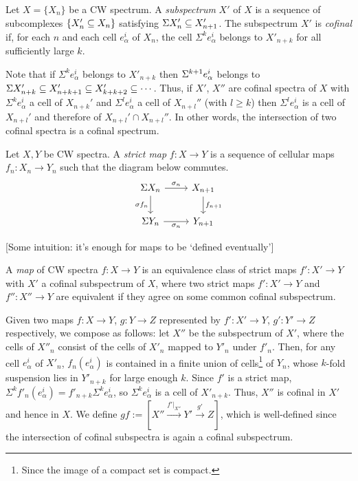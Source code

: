 \documentclass{MetricNotes2023}
\def\subq{\ensuremath\subseteq}
\def\SIgma{\ensuremath\Sigma}
\begin{document}
\begin{definition}
Let \(X=\{X_n\}\) be a CW spectrum. A \textit{subspectrum} \(X'\) of \(X\) is a sequence of subcomplexes \(\{X_n'\subq X_n\}\) satisfying \(\Sigma X_n'\subq X_{n+1}'\). The subspectrum \(X'\) is \textit{cofinal} if, for each \(n\) and each cell \(e^i_\alpha\) of \(X_n\), the cell \(\Sigma^k e_\alpha^i\) belongs to \(X'_{n+k}\) for all sufficiently large \(k\).
\end{definition}

Note that if \(\Sigma^ke^i_\alpha\) belongs to \(X'_{n+k}\) then \(\SIgma^{k+1}e^i_\alpha\) belongs to \(\Sigma X'_{n+k}\subq X'_{n+k+1}\subq X'_{k+k+2}\subq \cdots\). Thus, if \(X'\), \(X''\) are cofinal spectra of \(X\) with \(\Sigma^k e_{\alpha}^i\) a cell of \(X_{n+k}'\) and \(\Sigma^l e_\alpha^i\) a cell of \(X_{n+l}''\) (with \(l\geq k\)) then \(\Sigma^l e_\alpha^i\) is a cell of \(X_{n+l}'\) and therefore of \(X_{n+l}'\cap X_{n+l}''\). In other words, the intersection of two cofinal spectra is a cofinal spectrum.

\begin{definition}
Let \(X, Y\) be CW spectra. A \textit{strict map} \(f : X \to Y\) is a sequence of cellular maps \(f_n : X_n \to Y_n\) such that the diagram below commutes.
\[\begin{tikzcd}
\Sigma X_n \arrow[r, "\sigma_n"] \arrow[d, swap, "\sigma f_n"]  & X_{n+1} \arrow[d, "f_{n+1}"]  \\
\SIgma Y_n \arrow[r, swap, "\sigma_n"]  & Y_{n+1}
\end{tikzcd}\]
\end{definition}

[Some intuition: it's enough for maps to be `defined eventually']

\begin{definition}
A \textit{map} of CW spectra \(f : X \to Y\) is an equivalence class of strict maps \(f' : X' \to Y\) with \(X'\) a cofinal subspectrum of \(X\), where two strict maps \(f' : X' \to Y\) and \(f'' : X'' \to Y\) are equivalent if they agree on some common cofinal subspectrum. 
\end{definition}

Given two maps \(f : X \to Y\), \(g : Y \to Z\) represented by \(f' : X' \to Y\), \(g' : Y' \to Z\) respectively, we compose as follows: let \(X''\) be the subspectrum of \(X'\), where the cells of \(X''_n\) consist of the cells of \(X'_n\) mapped to \(Y'_n\) under \(f'_n\). Then, for any cell \(e^i_\alpha\) of \(X'_n\), \(f_n(e^i_\alpha)\) is contained in a finite union of cells\footnote{Since the image of a compact set is compact.} of \(Y_n\), whose \(k\)-fold suspension lies in \(Y'_{n+k}\) for large enough \(k\). Since \(f'\) is a strict map, \(\Sigma^kf'_n(e^i_\alpha)=f'_{n+k}\Sigma^ke^i_\alpha\), so \(\Sigma^ke^i_\alpha\) is a cell of \(X'_{n+k}\). Thus, \(X''\) is cofinal in \(X'\) and hence in \(X\). We define \(gf := [X'' \xrightarrow{f'|_{X''}}Y' \xrightarrow{g'}Z]\), which is well-defined since the intersection of cofinal subspectra is again a cofinal subspectrum. 
\end{document}

